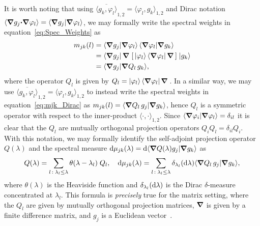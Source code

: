 \documentclass[amsa]{ipart}
\begin{document}
It is worth noting that using
$\overline{\langle g_k,\varphi_l\rangle}_{1,2}=\langle\varphi_l,g_k\rangle_{1,2}$ and Dirac 
notation $\langle\mbox{\boldmath${\nabla}$} g_j\mbox{\boldmath${\cdot}$}\mbox{\boldmath${\nabla}$}\varphi_l\rangle=\langle\mbox{\boldmath${\nabla}$} g_j|\mbox{\boldmath${\nabla}$}\varphi_l\rangle$, we
may formally write the spectral weights in
equation~\eqref{eq:Spec_Weights} as
%
\begin{align}\label{eq:mjk_Dirac}
  m_{jk}(l)%
        &=\langle\bnabla g_j|\bnabla\varphi_l\rangle\,\langle\bnabla\varphi_l|\bnabla g_k\rangle
        \\\notag
        &=\langle\bnabla
        g_j|\,\bnabla\;[\,|\varphi_l\rangle\,\langle\bnabla\varphi_l|\,\bnabla\,]\;|g_k\rangle
        \\\notag
        &=\langle\bnabla g_j|\bnabla Q_l\,g_k\rangle,
        \notag 
\end{align}
%
where the operator $Q_l$ is given by
$Q_l=|\varphi_l\rangle\,\langle\mbox{\boldmath${\nabla}$}\varphi_l|\,\mbox{\boldmath${\nabla}$}\,$. In a similar way, we may use
$\overline{\langle g_k,\varphi_l\rangle}_{1,2}=\langle\varphi_l,g_k\rangle_{1,2}$ to instead
write the spectral weights in equation~\eqref{eq:mjk_Dirac} as
$m_{jk}(l)=\langle\mbox{\boldmath${\nabla}$} Q_l\,g_j|\mbox{\boldmath${\nabla}$} g_k\rangle$, hence $Q_l$ is a symmetric
operator with respect to the inner-product $\langle\cdot,\cdot\rangle_{1,2}$. Since
$\langle\mbox{\boldmath${\nabla}$}\varphi_i|\mbox{\boldmath${\nabla}$}\varphi_l\rangle=\delta_{il}$ it is clear that the $Q_l$ are
mutually orthogonal projection operators $Q_iQ_l=\delta_{il}Q_i$. With this
notation, we may formally identify the self-adjoint projection
operator $Q(\lambda)$ and the spectral measure
$\mathrm{d}\mu_{jk}(\lambda)=\mathrm{d}\langle\mbox{\boldmath${\nabla}$} Q(\lambda)g_j|\mbox{\boldmath${\nabla}$} g_k\rangle$ as 
%
\begin{align}
  Q(\lambda)=\sum_{l\,:\;\lambda_l\leq\lambda}\theta(\lambda-\lambda_l)\;Q_l,
  \quad
  \d\mu_{jk}(\lambda)=\sum_{l\,:\;\lambda_l\leq\lambda}\delta_{\lambda_l}(\d\lambda)\langle\bnabla Q_l\,g_j|\bnabla g_k\rangle,
\end{align}
%
where $\theta(\lambda)$ is the Heaviside function and $\delta_{\lambda_l}(\mathrm{d}\lambda)$ is the Dirac
$\delta$-measure concentrated at $\lambda_l$. This formula is \emph{precisely} true
for the matrix setting, where the $Q_l$ are given by mutually
orthogonal projection matrices, $\mbox{\boldmath${\nabla}$}$ is given by a finite
difference matrix, and $g_j$ is a Euclidean
vector~\cite{Murphy_Advective_Diffusion_Steady}.  


 
\end{document}
